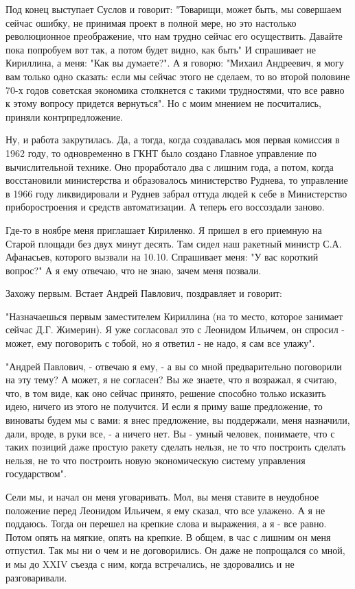 \documentclass{article}
\begin{document}
Под конец выступает Суслов и говорит: "Товарищи, может быть, мы совершаем сейчас
ошибку, не принимая проект в полной мере, но это настолько революционное
преображение, что нам трудно сейчас его осуществить. Давайте пока попробуем вот
так, а потом будет видно, как быть" И спрашивает не Кириллина, а меня: "Как вы
думаете?". А я говорю: "Михаил Андреевич, я могу вам только одно сказать: если
мы сейчас этого не сделаем, то во второй половине 70-х годов советская экономика
столкнется с такими трудностями, что все равно к этому вопросу придется
вернуться". Но с моим мнением не посчитались, приняли контрпредложение.

Ну, и работа закрутилась. Да, а тогда, когда создавалась моя первая комиссия в
1962 году, то одновременно в ГКНТ было создано Главное управление по
вычислительной технике. Оно проработало два с лишним года, а потом, когда
восстановили министерства и образовалось министерство Руднева, то управление в
1966 году ликвидировали и Руднев забрал оттуда людей к себе в Министерство
приборостроения и средств автоматизации. А теперь его воссоздали заново.

Где-то в ноябре меня приглашает Кириленко. Я пришел в его приемную на Старой
площади без двух минут десять. Там сидел наш ракетный министр С.А. Афанасьев,
которого вызвали на 10.10. Спрашивает меня: "У вас короткий вопрос?" А я ему
отвечаю, что не знаю, зачем меня позвали.

Захожу первым. Встает Андрей Павлович, поздравляет и говорит:

"Назначаешься первым заместителем Кириллина (на то место, которое занимает
сейчас Д.Г. Жимерин). Я уже согласовал это с Леонидом Ильичем, он спросил -
может, ему поговорить с тобой, но я ответил - не надо, я сам все улажу".

"Андрей Павлович, - отвечаю я ему, - а вы со мной предварительно поговорили на
эту тему? А может, я не согласен? Вы же знаете, что я возражал, я считаю, что, в
том виде, как оно сейчас принято, решение способно только исказить идею, ничего
из этого не получится. И если я приму ваше предложение, то виноваты будем мы с
вами: я внес предложение, вы поддержали, меня назначили, дали, вроде, в руки
все, - а ничего нет. Вы - умный человек, понимаете, что с таких позиций даже
простую ракету сделать нельзя, не то что построить сделать нельзя, не то что
построить новую экономическую систему управления государством".

Сели мы, и начал он меня уговаривать. Мол, вы меня ставите в неудобное положение
перед Леонидом Ильичем, я ему сказал, что все улажено. А я не поддаюсь. Тогда он
перешел на крепкие слова и выражения, а я - все равно. Потом опять на мягкие,
опять на крепкие. В общем, в час с лишним он меня отпустил. Так мы ни о чем и не
договорились. Он даже не попрощался со мной, и мы до XXIV съезда с ним, когда
встречались, не здоровались и не разговаривали.
\end{document}
